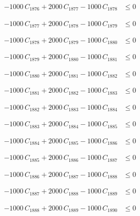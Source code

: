 \documentclass[a4paper,11pt]{article}
\begin{document}
\begin{align}
-1000\,C_{1876} + 2000\,C_{1877} - 1000\,C_{1878} &\leq 0 \nonumber
\end{align}

\begin{align}
-1000\,C_{1877} + 2000\,C_{1878} - 1000\,C_{1879} &\leq 0 \nonumber
\end{align}

\begin{align}
-1000\,C_{1878} + 2000\,C_{1879} - 1000\,C_{1880} &\leq 0 \nonumber
\end{align}

\begin{align}
-1000\,C_{1879} + 2000\,C_{1880} - 1000\,C_{1881} &\leq 0 \nonumber
\end{align}

\begin{align}
-1000\,C_{1880} + 2000\,C_{1881} - 1000\,C_{1882} &\leq 0 \nonumber
\end{align}

\begin{align}
-1000\,C_{1881} + 2000\,C_{1882} - 1000\,C_{1883} &\leq 0 \nonumber
\end{align}

\begin{align}
-1000\,C_{1882} + 2000\,C_{1883} - 1000\,C_{1884} &\leq 0 \nonumber
\end{align}

\begin{align}
-1000\,C_{1883} + 2000\,C_{1884} - 1000\,C_{1885} &\leq 0 \nonumber
\end{align}

\begin{align}
-1000\,C_{1884} + 2000\,C_{1885} - 1000\,C_{1886} &\leq 0 \nonumber
\end{align}

\begin{align}
-1000\,C_{1885} + 2000\,C_{1886} - 1000\,C_{1887} &\leq 0 \nonumber
\end{align}

\begin{align}
-1000\,C_{1886} + 2000\,C_{1887} - 1000\,C_{1888} &\leq 0 \nonumber
\end{align}

\begin{align}
-1000\,C_{1887} + 2000\,C_{1888} - 1000\,C_{1889} &\leq 0 \nonumber
\end{align}

\begin{align}
-1000\,C_{1888} + 2000\,C_{1889} - 1000\,C_{1890} &\leq 0 \nonumber
\end{align}
\end{document}
